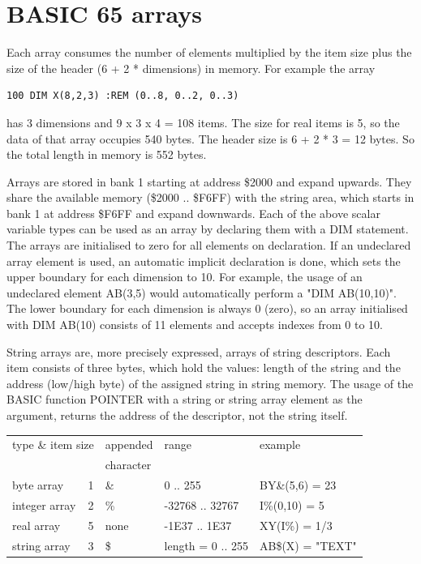 \section{BASIC 65 arrays}

Each array consumes the number of elements multiplied by the item size
plus the size of the header (6 + 2 * dimensions) in memory.
For example the array
\begin{tcolorbox}[colback=black,coltext=white]
\verbatimfont{\codefont}
\begin{verbatim}
100 DIM X(8,2,3) :REM (0..8, 0..2, 0..3)
\end{verbatim}
\end{tcolorbox}
has 3 dimensions and 9 x 3 x 4 = 108 items.
The size for real items is 5, so the data of that array occupies 540 bytes.
The header size is 6 + 2 * 3 = 12 bytes.
So the total length in memory is 552 bytes.

Arrays are stored in bank 1 starting at address \$2000 and expand upwards.
They share the available memory (\$2000 .. \$F6FF) with the string area,
which starts in bank 1 at address \$F6FF and expand downwards.
Each of the above scalar variable types can be used as an array by declaring
them with a DIM statement. The arrays are initialised to zero for all
elements on declaration. If an undeclared array element is used,
an automatic implicit declaration is done, which sets the upper  boundary
for each dimension to 10. For example, the usage of an undeclared element
AB(3,5) would automatically perform a "DIM AB(10,10)".
The lower boundary for each dimension is always 0 (zero),
so an array initialised with DIM AB(10) consists of 11 elements and accepts indexes from
0 to 10.

String arrays are, more precisely expressed, arrays of string
descriptors. Each item consists of three bytes, which hold
the values: length of the string and the address (low/high byte)
of the assigned string in string memory.
The usage of the BASIC function POINTER with a string or
string array element as the argument, returns the address of the descriptor, not the string itself.

{\ttfamily
\setlength{\tabcolsep}{1mm}
\begin{center}
\begin{tabular}{|l|l|l|l|l|}
\hline
\multicolumn{2}{|c|}{type \& item size} & appended  & range    & example  \\
\multicolumn{2}{|c|}{}                  & character &          &          \\
\hline
byte     array &  1     &    \&    & 0 .. 255        & BY\&(5,6) = 23 \\
integer  array &  2     &    \%    & -32768 .. 32767 & I\%(0,10) = 5    \\
real     array &  5     &   none   & -1E37 .. 1E37   & XY(I\%) = 1/3   \\
string   array &  3     &    \$    & length = 0 .. 255 & AB\$(X) = "TEXT" \\
\hline
\end{tabular}
\end{center}
}

